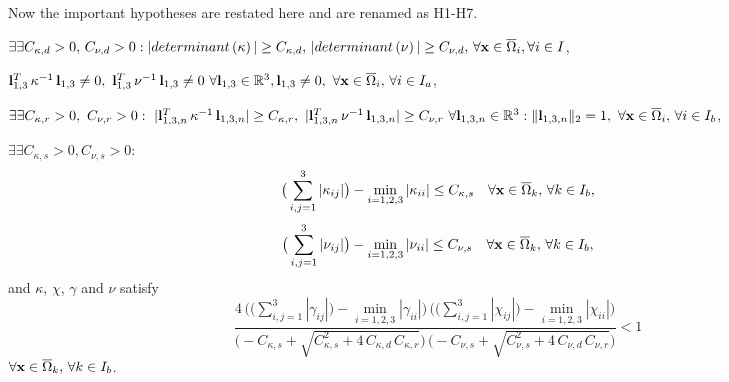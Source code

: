 Now the important hypotheses are restated here and are renamed as H1-H7.

\begin{description}[leftmargin=32pt,labelsep=7pt]
  \item[H1.]
    $\exists\exists C_{\kappa,d} > 0, \, C_{\nu,d} > 0:
      |determinant\left(\kappa\right)| \ge C_{\kappa,d}, \,
      |determinant\left(\nu\right)| \ge C_{\nu,d}, \, 
      \forall {\bf x} \in \overline{\Omega}_i, \forall i \in I$, 
\end{description}
%
\begin{description}[leftmargin=32pt,labelsep=7pt]
  \item[H2.]
    ${\bf l}_{1,3}^T \, \kappa^{-1} \, {\bf l}_{1,3} \ne 0, \
    {\bf l}_{1,3}^T \, \nu^{-1} \, {\bf l}_{1,3} \ne 0 \
    \forall {\bf l}_{1,3} \in \mathbb{R}^3, {\bf l}_{1,3} \ne 0, \
    \forall {\bf x} \in \overline{\Omega}_i, \, \forall i \in I_a$,
\end{description}
%
\begin{description}[leftmargin=38pt,labelsep=7pt]
  \item[H3.]
    $\exists \exists C_{\kappa,r} > 0, \ C_{\nu,r} > 0: \ 
      |{\bf l}_{1,3,n}^T \, \kappa^{-1} \, {\bf l}_{1,3,n}| \ge C_{\kappa,r}, \
      |{\bf l}_{1,3,n}^T \, \nu^{-1} \, {\bf l}_{1,3,n}| \ge C_{\nu,r}
      \ \forall {\bf l}_{1,3,n} \in \mathbb{R}^3: \| {\bf l}_{1,3,n} \|_2 = 1, \
      \forall {\bf x} \in \overline{\Omega}_i, \, \forall i \in I_b$,
\end{description}
%
\begin{description}[leftmargin=32pt,labelsep=7pt]
  \item[H4.]
    $\exists \exists C_{\kappa,s} > 0, C_{\nu,s} > 0$:
    \begin{equation}
      \big( \sum_{i, j = 1}^3 |\kappa_{ij}| \big) - 
        \min_{i=1,2,3} |\kappa_{ii}| \le C_{\kappa,s}
      \quad \forall {\bf x} \in \overline{\Omega}_k, \, \forall k \in I_b,
    \end{equation}
    \begin{equation}
      \big( \sum_{i, j = 1}^3 |\nu_{ij}| \big) - 
        \min_{i=1,2,3} |\nu_{ii}| \le C_{\nu,s}
      \quad \forall {\bf x} \in \overline{\Omega}_k, \, \forall k \in I_b,
    \end{equation}
    and $\kappa$, $\chi$, $\gamma$ and $\nu$ satisfy
    \begin{equation} \label{condizionesubianisotropixalgogenerale}
      \frac{4 \,
            \Big( \big( \sum_{i, j = 1}^3 |\gamma_{ij}| \big) - 
                  \min_{i=1,2,3} |\gamma_{ii}| \Big)
            \,
            \Big( \big( \sum_{i, j = 1}^3 |\chi_{ij}| \big) - 
                  \min_{i=1,2,3} |\chi_{ii}| \Big)
           }{
        \big( 
          - C_{\kappa,s} + 
          \sqrt{ C_{\kappa,s}^2 + 4 \, C_{\kappa,d} \, C_{\kappa,r}} 
        \big) \, 
        \big( 
          - C_{\nu,s} + 
          \sqrt{ C_{\nu,s}^2 + 4 \, C_{\nu,d} \, C_{\nu,r}} 
        \big)} 
      < 1
    \end{equation}
    $\forall {\bf x} \in \overline{\Omega}_k, \, \forall k \in I_b$.
\end{description}
%

